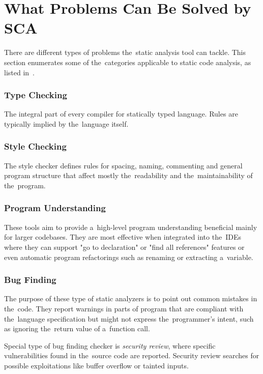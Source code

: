 \documentclass[
  digital, %
  table,   %
  lof,     %
  lot,     %
  oneside,
]{fithesis3}
\begin{document}
\section{What Problems Can Be Solved by SCA}
There are different types of problems the~static analysis tool can tackle. This section enumerates some of the~categories applicable to static code analysis, as listed in~\cite{secure-programming-sca}.

\subsubsection{Type Checking}
The integral part of every compiler for statically typed language. Rules are typically implied by the~language itself.

\subsubsection{Style Checking}
The style checker defines rules for spacing, naming, commenting and general program structure that affect mostly the~readability and the~maintainability of the~program. 

\subsubsection{Program Understanding}
These tools aim to provide a~high-level program understanding beneficial mainly for larger codebases. They are most effective when integrated into the~IDEs where they can support "go to declaration" or "find all references" features or even automatic program refactorings such as renaming or extracting a~variable.

\subsubsection{Bug Finding}
The  purpose of these type of static analyzers is to point out common mistakes in the~code. They report warnings in parts of program that are compliant with the~language specification but might not express the~programmer's intent, such as ignoring the~return value of a~function call.

Special type of bug finding checker is \textit{security review}, where specific vulnerabilities found in the~source code are reported. Security review searches for possible exploitations like buffer overflow or tainted inputs.
  
\end{document}
